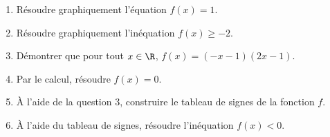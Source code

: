 \documentclass[10pt,french]{article}
\begin{document}
\begin{enumerate}
        \item Résoudre graphiquement l'équation $f(x) = 1$.
        \item Résoudre graphiquement l'inéquation $f(x) \geqslant -2$.
        \item Démontrer que pour tout $x \in \R$, $f(x) = (-x - 1)(2x - 1)$.
        \item Par le calcul, résoudre $f(x) = 0$.
        \item À l'aide de la question 3, construire le tableau de signes de la fonction $f$.
        \item À l'aide du tableau de signes, résoudre l'inéquation $f(x) < 0$.
\end{enumerate}
\end{document}
